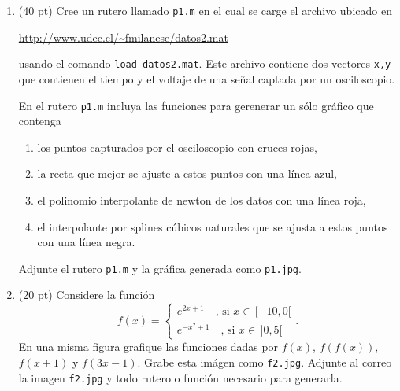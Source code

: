 \documentclass[11pt]{article}
\begin{document}
\begin{enumerate}
\item (40 pt) Cree un rutero llamado \texttt{p1.m} en el cual se carge el archivo ubicado en
\begin{center}
\url{http://www.udec.cl/~fmilanese/datos2.mat}
\end{center}
usando el comando \texttt{load datos2.mat}. Este archivo contiene dos 
vectores \texttt{x,y} que contienen el tiempo y el voltaje de una señal captada por un osciloscopio.

En el rutero \texttt{p1.m} incluya las funciones para gerenerar un sólo gr\'afico que contenga
\begin{enumerate}
	\item los puntos capturados por el osciloscopio con cruces rojas,
    \item la recta que mejor se ajuste a estos puntos con una línea azul,
    \item el polinomio interpolante de newton de los datos con una l\'inea roja,
    \item el interpolante por splines c\'ubicos naturales que se ajusta a estos puntos con una línea negra.
\end{enumerate}
Adjunte el rutero \texttt{p1.m} y la gr\'afica generada como \texttt{p1.jpg}.




\item (20 pt) Considere la funci\'on
$$
f(x)=
\begin{cases}
e^{2x+1} 	\quad  \text{, si } x\in\,[-10,0[\\
e^{-x^2+1} 	\quad  \text{, si } x\in\,]0,5[
\end{cases}.
$$
En una misma figura grafique las funciones dadas por $f(x)$, $f(f(x))$, $f(x+1)$ y $f(3x-1)$. Grabe esta im\'agen como \texttt{f2.jpg}. Adjunte al correo la imagen \texttt{f2.jpg} y todo rutero o funci\'on necesario para generarla.


\end{enumerate}
\end{document}
